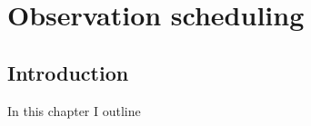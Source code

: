 \chapter{Observation scheduling}
\label{chap:scheduling}
\chaptoc{}


\newpage
\section{Introduction}
\label{sec:scheduling_intro}
\begin{colsection}


\begin{colsection}

In this chapter I outline 

\end{colsection}


\end{colsection}


\newpage
